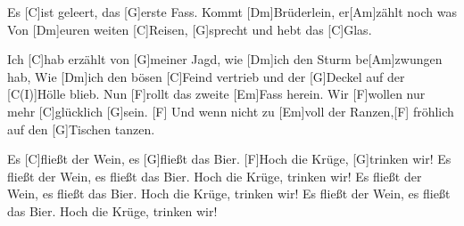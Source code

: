 \begin{guitar}
	\begin{highlightbar}
		Es [C]ist geleert, das [G]erste Fass. Kommt [Dm]Brüderlein, er[Am]zählt noch was
		Von [Dm]euren weiten [C]Reisen, [G]sprecht und hebt das [C]Glas.%
	\end{highlightbar}
	
	Ich [C]hab erzählt von [G]meiner Jagd, wie [Dm]ich den Sturm be[Am]zwungen hab,
	Wie [Dm]ich den bösen [C]Feind vertrieb und der [G]Deckel auf der [C(I)]Hölle blieb.
	Nun [F]rollt das zweite [Em]Fass herein. Wir [F]wollen nur mehr [C]glücklich [G]sein.
	[F] Und wenn nicht zu [Em]voll der Ranzen,[F] fröhlich auf den [G]Tischen tanzen.
	
	Es [C]fließt der Wein, es [G]fließt das Bier. [F]Hoch die Krüge, [G]trinken wir!
	Es fließt der Wein, es fließt das Bier. Hoch die Krüge, trinken wir!
	Es fließt der Wein, es fließt das Bier. Hoch die Krüge, trinken wir!
	Es fließt der Wein, es fließt das Bier. Hoch die Krüge, trinken wir!
\end{guitar}





